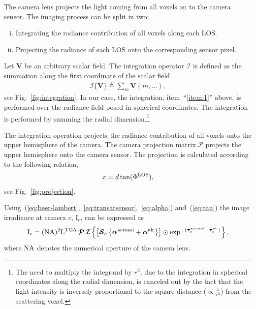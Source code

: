 \documentclass[10pt,twocolumn,letterpaper]{article}
\newcommand{\OpSphere}{\bm{\mathcal{S}}}
\newcommand{\OpInt}{\bm{\mathcal{I}}}
\newcommand{\OpCamera}{\bm{\mathcal{P}}}
\newcommand{\curly}[1]{\left\{#1\right\}}
\newcommand{\recty}[1]{\left[#1\right]}
\newcommand{\vect}[1]{\bm{#1}}
\newcommand{\mat}[1]{\bm{#1}}
\begin{document}
The camera lens projects the light coming from all voxels on to the
camera sensor. The imaging process can be split in two:
\begin{enumerate}[i.]
\item \label{item:1} Integrating the radiance contribution of all
  voxels along each LOS.
\item \label{item:2} Projecting the radiance of each LOS onto the
  corresponding sensor pixel.
\end{enumerate}
Let $\mat{V}$ be an arbitrary scalar field. The integration operator
$\OpInt$ is defined as the summation along the first coordinate of the
scalar field
\begin{align}
  \OpInt\{\mat{V}\} \triangleq \sum_m \mat{V}(m,...),
  \label{eq:operator_integral}
\end{align}
see Fig.~\ref{fig:integration}. In our case, the integration,
item~``\ref{item:1}'' above, is performed over the radiance field
posed in spherical coordinates. The integration is performed by
summing the radial dimension.\footnote{The need to multiply the
  integrand by $r^2$, due to the integration in spherical
  coordinates along the radial dimension, is canceled out by the
  fact that the light intensity is inversely proportional to the
  square distance ($\propto\frac{1}{r^2}$) from the scattering voxel.}

The integration operation projects the radiance contribution of all
voxels onto the upper hemisphere of the camera. The camera projection
matrix $\OpCamera$ projects the upper hemisphere onto the camera
sensor. The projection is calculated according to the following
relation,
\begin{align}
  x = d \tan(\Phi^{\rm LOS}),
\end{align}
see Fig.~\ref{fig:projection}.

Using~(\ref{eq:beer-lambert},~\ref{eq:transatsensor},~\ref{eq:alpha})
and~(\ref{eq:tau}) the image irradiance at camera $c$, $\mathrm{I}_c$,
can be expressed as
\begin{align}
  \mathrm{I}_c=({\rm NA})^2\mathrm{L}^{\rm TOA} \, \OpCamera \, \OpInt
  \curly{\recty{\OpSphere_c \curly{\vect{\alpha}^{\rm aerosol} +
        \vect{\alpha}^{\rm air}}} \odot \exp^{-(\vect{\tau}_c^{\rm
        aerosol} + \vect{\tau}_c^{\rm air})}},
  \label{eq:atsensor}
\end{align}
where $\rm{NA}$ denotes the numerical aperture of the camera lens.
\end{document}
